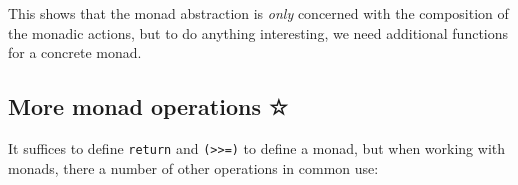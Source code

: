 \documentclass[11pt,
  american,
  DIV13]{article}
\newenvironment{Shaded}{}{}
\newcommand{\DataTypeTok}[1]{\textcolor[rgb]{0.56,0.13,0.00}{#1}}
\newcommand{\FunctionTok}[1]{\textcolor[rgb]{0.02,0.16,0.49}{#1}}
\newcommand{\NormalTok}[1]{#1}
\newcommand{\OtherTok}[1]{\textcolor[rgb]{0.00,0.44,0.13}{#1}}
\begin{document}
This shows that the monad abstraction is \emph{only} concerned with the
composition of the monadic actions, but to do anything interesting, we
need additional functions for a concrete monad.

\hypertarget{monad-ops}{%
\subsection{More monad operations ☆}\label{monad-ops}}

It suffices to define \texttt{return} and
\texttt{(\textgreater{}\textgreater{}=)} to define a monad, but when
working with monads, there a number of other operations in common use:

\begin{Shaded}
\end{Shaded}
\end{document}
